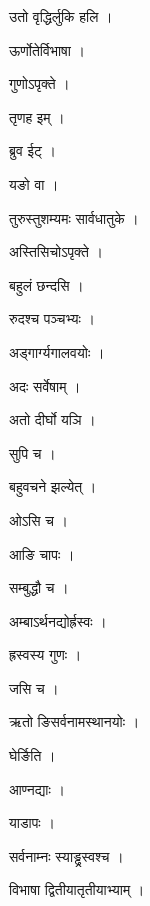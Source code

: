 \documentclass[10pt, openany]{book}
\begin{document}
\noindent उतो वृद्धिर्लुकि हलि ।

\noindent ऊर्णोतेर्विभाषा ।

\noindent गुणोऽपृक्ते ।

\noindent तृणह इम् ।

\noindent ब्रुव ईट् ।

\noindent यङो वा ।

\noindent तुरुस्तुशम्यमः सार्वधातुके ।

\noindent अस्तिसिचोऽपृक्ते ।

\noindent बहुलं छन्दसि ।

\noindent रुदश्च पञ्चभ्यः ।

\noindent अड्गार्ग्यगालवयोः ।

\noindent अदः सर्वेषाम् ।

\noindent अतो दीर्घो यञि ।

\noindent सुपि च ।

\noindent बहुवचने झल्येत् ।

\noindent ओऽसि च ।

\noindent आङि चापः ।

\noindent सम्बुद्धौ च ।

\noindent अम्बाऽर्थनद्योर्ह्रस्वः ।

\noindent ह्रस्वस्य गुणः ।

\noindent जसि च ।

\noindent ऋतो ङिसर्वनामस्थानयोः ।

\noindent घेर्ङिति ।

\noindent आण्नद्याः ।

\noindent याडापः ।

\noindent सर्वनाम्नः स्याड्ढ्रस्वश्च ।

\noindent विभाषा द्वितीयातृतीयाभ्याम् ।
\end{document}
